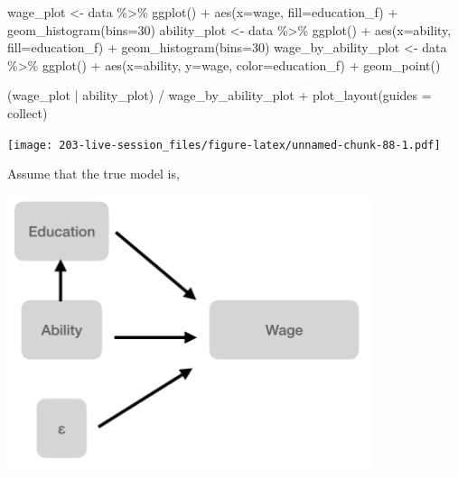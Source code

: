 \documentclass[
]{book}
\newenvironment{Shaded}{\begin{snugshade}}{\end{snugshade}}
\newcommand{\AttributeTok}[1]{\textcolor[rgb]{0.77,0.63,0.00}{#1}}
\newcommand{\DecValTok}[1]{\textcolor[rgb]{0.00,0.00,0.81}{#1}}
\newcommand{\FunctionTok}[1]{\textcolor[rgb]{0.00,0.00,0.00}{#1}}
\newcommand{\NormalTok}[1]{#1}
\newcommand{\OtherTok}[1]{\textcolor[rgb]{0.56,0.35,0.01}{#1}}
\newcommand{\SpecialCharTok}[1]{\textcolor[rgb]{0.00,0.00,0.00}{#1}}
\newcommand{\StringTok}[1]{\textcolor[rgb]{0.31,0.60,0.02}{#1}}
\theoremstyle{definition}
\theoremstyle{definition}
\theoremstyle{definition}
\theoremstyle{definition}
\theoremstyle{remark}
\begin{document}
\begin{Shaded}
\begin{Highlighting}[]
\NormalTok{wage\_plot }\OtherTok{\textless{}{-}}\NormalTok{ data }\SpecialCharTok{\%\textgreater{}\%} 
  \FunctionTok{ggplot}\NormalTok{() }\SpecialCharTok{+} 
  \FunctionTok{aes}\NormalTok{(}\AttributeTok{x=}\NormalTok{wage, }\AttributeTok{fill=}\NormalTok{education\_f) }\SpecialCharTok{+} 
  \FunctionTok{geom\_histogram}\NormalTok{(}\AttributeTok{bins=}\DecValTok{30}\NormalTok{)}
\NormalTok{ability\_plot }\OtherTok{\textless{}{-}}\NormalTok{ data }\SpecialCharTok{\%\textgreater{}\%} 
  \FunctionTok{ggplot}\NormalTok{() }\SpecialCharTok{+} 
  \FunctionTok{aes}\NormalTok{(}\AttributeTok{x=}\NormalTok{ability, }\AttributeTok{fill=}\NormalTok{education\_f) }\SpecialCharTok{+} 
  \FunctionTok{geom\_histogram}\NormalTok{(}\AttributeTok{bins=}\DecValTok{30}\NormalTok{)}
\NormalTok{wage\_by\_ability\_plot }\OtherTok{\textless{}{-}}\NormalTok{ data }\SpecialCharTok{\%\textgreater{}\%} 
  \FunctionTok{ggplot}\NormalTok{() }\SpecialCharTok{+} 
  \FunctionTok{aes}\NormalTok{(}\AttributeTok{x=}\NormalTok{ability, }\AttributeTok{y=}\NormalTok{wage, }\AttributeTok{color=}\NormalTok{education\_f) }\SpecialCharTok{+} 
  \FunctionTok{geom\_point}\NormalTok{()}
  

\NormalTok{(wage\_plot }\SpecialCharTok{|}\NormalTok{ ability\_plot) }\SpecialCharTok{/} 
\NormalTok{  wage\_by\_ability\_plot }\SpecialCharTok{+} 
  \FunctionTok{plot\_layout}\NormalTok{(}\AttributeTok{guides =} \StringTok{\textquotesingle{}collect\textquotesingle{}}\NormalTok{)}
\end{Highlighting}
\end{Shaded}

\texttt{[image: 203-live-session\_files/figure-latex/unnamed-chunk-88-1.pdf]}

Assume that the true model is,

\includegraphics[width=0.8\textwidth,height=\textheight]{images/wage_system.png}
\end{document}
